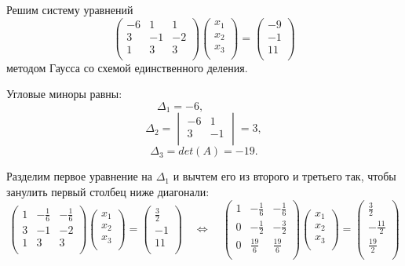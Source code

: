 \documentclass{article}
\begin{document}
\begin{example}
	Решим систему уравнений
	\[
		\begin{pmatrix}
			-6	& 1	& 1	\\
			3	& -1	& -2	\\
			1	& 3	& 3	\\
		\end{pmatrix}
		\begin{pmatrix}
			x_1 \\
			x_2 \\
			x_3 \\
		\end{pmatrix}
		=
		\begin{pmatrix}
			-9 \\
			-1 \\
			11 \\
		\end{pmatrix}
	\]
	методом Гаусса со схемой единственного деления.

	Угловые миноры равны:
	\[\Delta_1=-6,\qquad\qquad\;\]
	\[\Delta_2=
		\begin{vmatrix}
			-6	& 1	\\
			3	& -1	\\
		\end{vmatrix}
		=3,
	\]
	\[\Delta_3=det(A)=-19.\]

	Разделим первое уравнение на $\Delta_1$ и вычтем его из второго и
	третьего так, чтобы занулить первый столбец ниже диагонали:
	\[
		\begin{pmatrix}
			1	&-\frac{1}{6}	& -\frac{1}{6}	\\
			3	& -1	& -2	\\
			1	& 3	& 3	\\
		\end{pmatrix}
		\begin{pmatrix}
			x_1 \\
			x_2 \\
			x_3 \\
		\end{pmatrix}
		=
		\begin{pmatrix}
			\frac{3}{2} \\
			-1 \\
			11 \\
		\end{pmatrix}
		\quad\Leftrightarrow\quad
		\begin{pmatrix}
			1	&-\frac{1}{6}	& -\frac{1}{6}	\\
			0	& -\frac{1}{2}	& -\frac{3}{2}	\\
			0	& \frac{19}{6}	& \frac{19}{6}	\\
		\end{pmatrix}
		\begin{pmatrix}
			x_1 \\
			x_2 \\
			x_3 \\
		\end{pmatrix}
		=
		\begin{pmatrix}
			\frac{3}{2} \\
			-\frac{11}{2} \\
			\frac{19}{2} \\
		\end{pmatrix}
	\]


\end{example}
\end{document}
